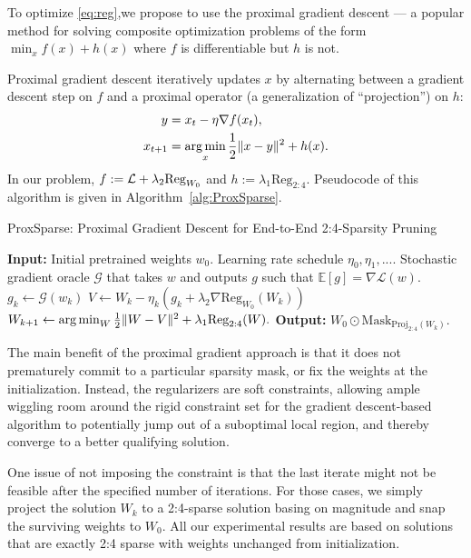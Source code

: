 To optimize \eqref{eq:reg},we propose to use the proximal gradient descent \citep{nesterov2013gradient} --- a popular method for solving composite optimization problems of the form $\min_x f(x) + h(x)$ where $f$ is differentiable but $h$ is not.

Proximal gradient descent iteratively updates $x$ by alternating between a gradient descent step on $f$ and a proximal operator (a generalization of ``projection'') on $h$:
\begin{subequations}
\begin{align}
    y &= x_t - \eta \nabla f(x_t), \\
    x_{t+1} &= \operatorname*{arg\,min}_{x} \frac{1}{2}\|x - y\|^2 + h(x).
\end{align}
\end{subequations}
In our problem, $f:=\mathcal{L} + \lambda_2\text{Reg}_{W_0}$ and $h:=\lambda_1\text{Reg}_{2:4}$. Pseudocode of this algorithm is given in Algorithm~\ref{alg:ProxSparse}.
\begin{algorithm}[!t]
\caption{\textsf{ProxSparse}: Proximal Gradient Descent for End-to-End 2:4-Sparsity Pruning}\label{alg:ProxSparse}
    \begin{algorithmic}[1]
        \State \textbf{Input:} Initial pretrained weights $w_0$. Learning rate schedule $\eta_0,\eta_1,...$. Stochastic gradient oracle $\mathcal{G}$ that takes $w$ and outputs $g$ such that $\mathbb{E}[g] = \nabla \mathcal{L}(w)$.
        \State $g_k \leftarrow  \mathcal{G}(w_{k})$ 
        \State $V \leftarrow W_{k} -\eta_k (g_k + \lambda_2\nabla \text{Reg}_{W_0}(W_k))$
        \State $W_{k+1} \leftarrow \operatorname*{arg\,min}_{W} \frac{1}{2}\|W - V\|^2 + \lambda_1\text{Reg}_{2:4}(W).$    
        \EndFor
        \State \textbf{Output:} $W_0 \odot \mathrm{Mask}_{ \mathrm{Proj}_{2:4}(W_k)}$.
    \end{algorithmic}
\end{algorithm}

The main benefit of the proximal gradient approach is that it does not prematurely commit to a particular sparsity mask, or fix the weights at the initialization. Instead, the regularizers are soft constraints, allowing ample wiggling room around the rigid constraint set for the gradient descent-based algorithm to potentially jump out of a suboptimal local region, and thereby converge to a better qualifying solution. 

One issue of not imposing the constraint is that the last iterate might not be feasible after the specified number of iterations. For those cases, we simply project the solution $W_k$ to a 2:4-sparse solution basing on magnitude and snap the surviving weights to $W_0$.
All our experimental results are based on solutions that are exactly 2:4 sparse with weights unchanged from initialization. %

